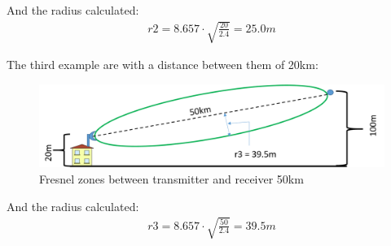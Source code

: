 And the radius calculated:
\begin{align*}
r2 = 8.657\cdot \sqrt{\frac{20}{2.4}} = 25.0m
\end{align*}

The third example are with a distance between them of 20km:

\begin{figure}[h]
	\centering
	\includegraphics[scale=0.50]{figures/Fresnel_50km.png}
	\caption{Fresnel zones between transmitter and receiver 50km}
	\label{fig:fresnel_zones_50km}
\end{figure}  

And the radius calculated:
\begin{align*}
r3 = 8.657\cdot \sqrt{\frac{50}{2.4}} = 39.5m
\end{align*}

\newpage